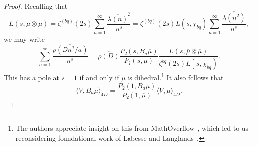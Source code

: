 \documentclass[11pt,reqno,oneside]{amsart}
\theoremstyle{plain}
\theoremstyle{definition}
\begin{document}
\begin{proof}
  Recalling that
  \[
    L(s, \overline{\mu} \otimes \overline{\mu})
    = \zeta^{(bq)}(2s) \sum_{n=1}^{\infty} \frac{\overline{\lambda(n)}^2}{n^s}
    = \zeta^{(bq)}(2s) L(s, \chi_{bq}) \sum_{n=1}^{\infty}  \frac{\overline{\lambda(n^2)}}{n^s},
  \]
  we may write
  \[
    \sum_{n=1}^{\infty} \frac{\overline{\rho(Dn^2/a)}}{n^s}
    = \overline{\rho(D)}
    \frac{P_2(s, B_a \overline{\mu})}{P_2(s, \overline{\mu})}
    \frac{L(s, \overline{\mu} \otimes \overline{\mu})}{\zeta^{bq}(2s) L(s,
      \chi_{bq})}.
  \]
  This has a pole at $s = 1$ if and only if $\mu$ is dihedral.\footnote{The
    authors appreciate insight on this from
    MathOverflow~\cite{moquestion_dihedral}, which led to us reconsidering
    foundational work of Labesse and Langlands~\cite{ll1979}.}
  It also follows that
  \begin{equation}\label{eq:inner_product_with_Ba}
    \langle V, B_a \mu \rangle_{4D}
    = \frac{P_2(1, B_a \overline{\mu})}{P_2(1, \overline{\mu})} \langle V, \mu
    \rangle_{4D}.
  \end{equation}


\end{proof}
\end{document}

